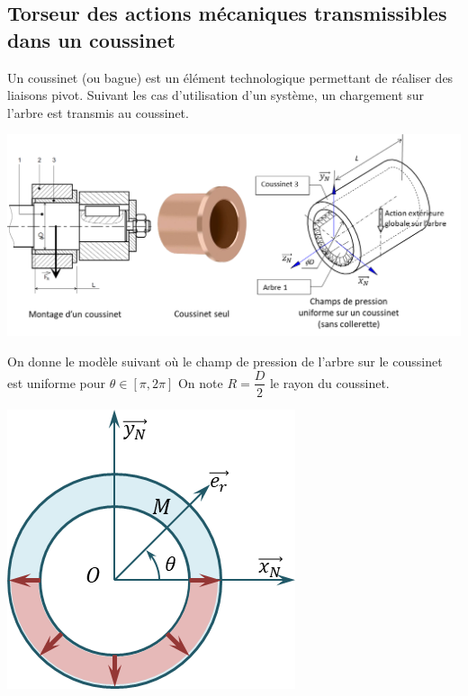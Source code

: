 \documentclass[10pt,fleqn]{article} %
\begin{document}

\vspace{4.5cm}
\pagestyle{fancy}
\thispagestyle{plain}


\def\columnseprulecolor{\color{ocre}}
\setlength{\columnseprule}{0.4pt} 

\ifprof
\begin{multicols}{2}
\else
\begin{multicols}{2}
\fi

\section*{Torseur des actions mécaniques transmissibles dans un coussinet}


\ifprof
\else
Un coussinet (ou bague) est un élément technologique permettant de réaliser des liaisons pivot. Suivant les cas d'utilisation d'un système, un chargement sur l'arbre est transmis au coussinet. 

\begin{center}
\includegraphics[width=\linewidth]{images/fig_01}
\end{center}


On donne le modèle suivant où le champ de pression de l'arbre sur le coussinet est uniforme pour $\theta\in[\pi,2\pi]$ 
On note $R=\dfrac{D}{2}$ le rayon du coussinet. 

\begin{center}
\includegraphics[width=.4\linewidth]{images/fig_02}
\end{center}
\fi


\end{multicols}
\end{multicols}
\end{document}
